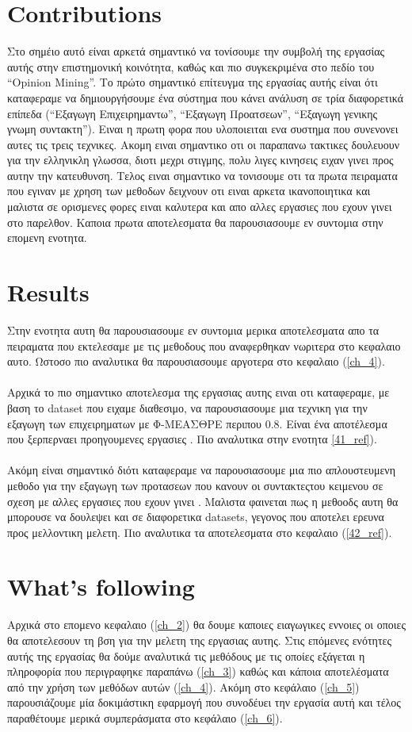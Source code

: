\section{Contributions}
\greektext Στο σημέιο αυτό είναι αρκετά σημαντικό να τονίσουμε την συμβολή της εργασίας αυτής στην επιστημονική κοινότητα, καθώς και πιο συγκεκριμένα στο πεδίο του ``Opinion Mining''. Το πρώτο σημαντικό επίτευγμα της εργασίας αυτής είναι ότι καταφεραμε να δημιουργήσουμε ένα σύστημα που κάνει ανάλυση σε τρία διαφορετικά επίπεδα (``Εξαγωγη Επιχειρημαντω'', ``Εξαγωγη Προατσεων'', ``Εξαγωγη γενικης γνωμη συντακτη''). Ειναι η πρωτη φορα που υλοποιειται ενα συστημα που συνενονει αυτες τις τρεις τεχνικες. Ακομη ειναι σημαντικο οτι οι παραπανω τακτικες δουλευουν για την ελληνικλη γλωσσα, διοτι μεχρι στιγμης, πολυ λιγες κινησεις ειχαν γινει προς αυτην την κατευθυνση. Τελος ειναι σημαντικο να τονισουμε οτι τα πρωτα πειραματα που εγιναν με χρηση των μεθοδων δειχνουν οτι ειναι αρκετα ικανοποιητικα και μαλιστα  σε ορισμενες φορες ειναι καλυτερα και απο αλλες εργασιες που εχουν γινει στο παρελθον. Καποια πρωτα αποτελεσματα θα παρουσιασουμε εν συντομια στην επομενη ενοτητα.
\latintext

\section{Results}
\greektext Στην ενοτητα αυτη θα παρουσιασουμε εν συντομια μερικα αποτελεσματα απο τα πειραματα που εκτελεσαμε με τις μεθοδους που αναφερθηκαν νωριτερα στο κεφαλαιο αυτο. Ωστοσο πιο αναλυτικα θα παρουσιασουμε αργοτερα στο κεφαλαιο (\ref{ch_4}).\\
\\
Αρχικά το πιο σημαντικο αποτελεσμα της εργασιας αυτης ειναι οτι καταφεραμε, με βαση το dataset που ειχαμε διαθεσιμο, να παρουσιασουμε μια τεχνικη για την εξαγωγη των επιχειρηματων με Φ-ΜΕΑΣΘΡΕ περιπου $0.8$. Είναι ένα αποτέλεσμα που ξερπερναει προηγουμενες εργασιες \cite{5}. Πιο αναλυτικα στην ενοτητα \ref{41_ref}).\\
\\
Ακόμη είναι σημαντικό διότι καταφεραμε να παρουσιασουμε μια πιο απλουστευμενη μεθοδο για την εξαγωγη των προτασεων που κανουν οι συντακτεςτου κειμενου σε σχεση με αλλες εργασιες που εχουν γινει \cite{9}. Μαλιστα φαινεται πως η μεθοοδς αυτη θα μπορουσε να δουλεψει και σε διαφορετικα datasets, γεγονος που αποτελει ερευνα προς μελλοντικη μελετη. Πιο αναλυτικα τα αποτελεσματα στο κεφαλαιο (\ref{42_ref}).
\latintext


\section{What’s following}
\greektext
Αρχικά στο επομενο κεφαλαιο (\ref{ch_2}) θα δουμε καποιες ειαγωγικες εννοιες οι οποιες θα αποτελεσουν τη βση για την μελετη της εργασιας αυτης. Στις επόμενες ενότητες αυτής της εργασίας θα δούμε αναλυτικά τις μεθόδους με τις οποίες εξάγεται η πληροφορία που περιγραφηκε παραπάνω (\ref{ch_3}) καθώς και κάποια αποτελέσματα από την χρήση των μεθόδων αυτών (\ref{ch_4}). Ακόμη στο κεφάλαιο (\ref{ch_5}) παρουσιάζουμε μία δοκιμάστικη εφαρμογή που συνοδέυει την εργασία αυτή και τέλος παραθέτουμε μερικά συμπεράσματα στο κεφάλαιο (\ref{ch_6}).
\latintext
